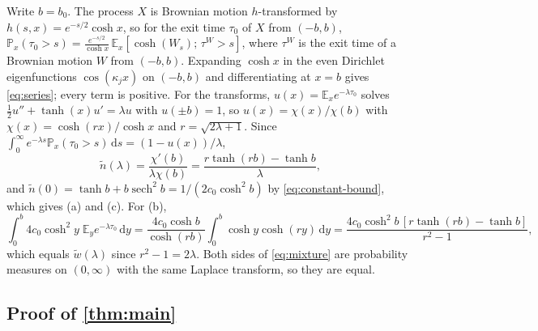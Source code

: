 \documentclass[11pt]{article}
\theoremstyle{definition}
\theoremstyle{remark}
\newcommand{\E}{\mathbb{E}}
\renewcommand{\P}{\mathbb{P}}
\newcommand{\dd}{\,\mathrm{d}}
\newcommand{\sech}{\operatorname{sech}}
\begin{document}
Write $b = b_0$. The process $X$ is Brownian motion $h$-transformed by $h(s, x) = e^{-s/2}\cosh x$,
so for the exit time $\tau_0$ of $X$ from $(-b, b)$,
$\P_x(\tau_0 > s) = \frac{e^{-s/2}}{\cosh x}\,\E_x[\cosh(W_s);\, \tau^W > s]$, where $\tau^W$ is the
exit time of a Brownian motion $W$ from $(-b, b)$. Expanding $\cosh x$ in the even Dirichlet
eigenfunctions $\cos(\kappa_j x)$ on $(-b, b)$ and differentiating at $x = b$ gives
\eqref{eq:series}; every term is positive. For the transforms, $u(x) = \E_x e^{-\lambda\tau_0}$
solves $\tfrac12 u'' + \tanh(x)u' = \lambda u$ with $u(\pm b) = 1$, so
$u(x) = \chi(x)/\chi(b)$ with $\chi(x) = \cosh(rx)/\cosh x$ and $r = \sqrt{2\lambda + 1}$. Since
$\int_0^\infty e^{-\lambda s}\P_x(\tau_0 > s)\dd s = (1 - u(x))/\lambda$,
\begin{equation}
  \tilde n(\lambda) = \frac{\chi'(b)}{\lambda\chi(b)} = \frac{r\tanh(rb) - \tanh b}{\lambda},
\end{equation}
and $\tilde n(0) = \tanh b + b\sech^2 b = 1/(2c_0\cosh^2 b)$ by \eqref{eq:constant-bound}, which
gives (a) and (c). For (b),
\begin{equation}
  \int_0^b 4c_0\cosh^2 y\;\E_y e^{-\lambda\tau_0}\dd y
  = \frac{4c_0\cosh b}{\cosh(rb)}\int_0^b \cosh y\cosh(ry)\dd y
  = \frac{4c_0\cosh^2 b\,[r\tanh(rb) - \tanh b]}{r^2 - 1},
\end{equation}
which equals $\tilde w(\lambda)$ since $r^2 - 1 = 2\lambda$. Both sides of \eqref{eq:mixture} are
probability measures on $(0, \infty)$ with the same Laplace transform, so they are equal.

\subsection{Proof of \texorpdfstring{\cref{thm:main}}{Theorem }}
\end{document}

